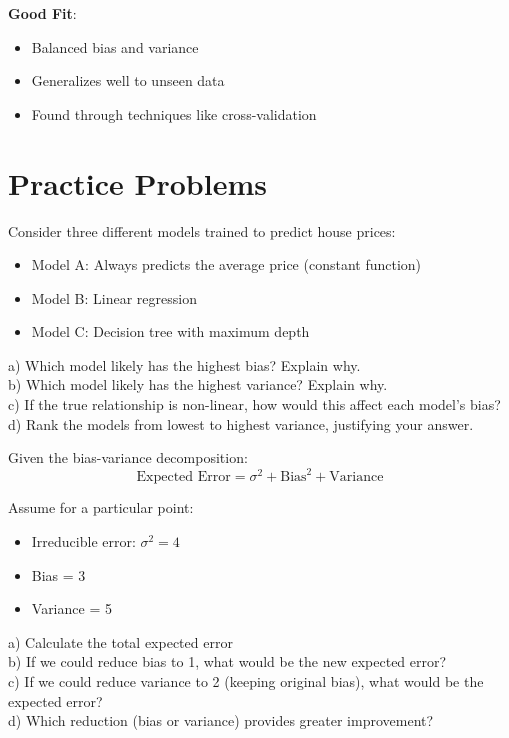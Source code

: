 \documentclass{article}
\newcounter{exercise}
\begin{document}
\textbf{Good Fit}:
\begin{itemize}
    \item Balanced bias and variance
    \item Generalizes well to unseen data
    \item Found through techniques like cross-validation
\end{itemize}

\section{Practice Problems}

\begin{tcolorbox}[colback=gray!5!white,colframe=gray!75!black,title=Problem \stepcounter{exercise}: Basic Bias-Variance Concepts]

Consider three different models trained to predict house prices:
\begin{itemize}
    \item Model A: Always predicts the average price (constant function)
    \item Model B: Linear regression
    \item Model C: Decision tree with maximum depth
\end{itemize}

a) Which model likely has the highest bias? Explain why.\\
b) Which model likely has the highest variance? Explain why.\\
c) If the true relationship is non-linear, how would this affect each model's bias?\\
d) Rank the models from lowest to highest variance, justifying your answer.
\end{tcolorbox}

\begin{tcolorbox}[colback=gray!5!white,colframe=gray!75!black,title=Problem \stepcounter{exercise}: Mathematical Understanding]

Given the bias-variance decomposition:
$$\text{Expected Error} = \sigma^2 + \text{Bias}^2 + \text{Variance}$$

Assume for a particular point:
\begin{itemize}
    \item Irreducible error: $\sigma^2 = 4$
    \item Bias = 3
    \item Variance = 5
\end{itemize}

a) Calculate the total expected error\\
b) If we could reduce bias to 1, what would be the new expected error?\\
c) If we could reduce variance to 2 (keeping original bias), what would be the expected error?\\
d) Which reduction (bias or variance) provides greater improvement?
\end{tcolorbox}
\end{document}
